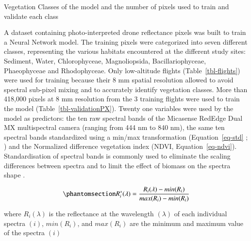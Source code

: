 \documentclass[
  number]{elsarticle}
\begin{document}
\begin{table}

\caption{\label{tbl-validationPX}Vegetation Classes of the model and the
number of pixels used to train and validate each class}


\end{table}%

A dataset containing photo-interpreted drone reflectance pixels was
built to train a Neural Network model. The training pixels were
categorized into seven different classes, representing the various
habitats encountered at the different study sites: Sediment, Water,
Chlorophyceae, Magnoliopsida, Bacillariophyceae, Phaeophyceae and
Rhodophyceae. Only low-altitude flights (Table~\ref{tbl-flights}) were
used for training because their 8 mm spatial resolution allowed to avoid
spectral sub-pixel mixing and to accurately identify vegetation classes.
More than 418,000 pixels at 8 mm resolution from the 3 training flights
were used to train the model (Table~\ref{tbl-validationPX}). Twenty one
variables were used by the model as predictors: the ten raw spectral
bands of the Micasense RedEdge Dual MX multispectral camera (ranging
from 444 nm to 840 nm), the same ten spectral bands standardized using a
min/max transformation (Equation~\ref{eq-std} ; \citep{Cao2017}) and the
Normalized difference vegetation index (NDVI, Equation~\ref{eq-ndvi}).
Standardisation of spectral bands is commonly used to eliminate the
scaling differences between spectra and to limit the effect of biomass
on the spectra shape \citetext{\citealp[
]{Douay2022}; \citealp{Davies2023}}.

\begin{equation}\phantomsection\label{eq-std}{
R_{i}^{*}(\lambda) = \frac{R_{i}(\lambda) - min(R_{i})}{max(R_{i})- min(R_{i})}
}\end{equation}

where \(R_{i}(\lambda)\) is the reflectance at the wavelength
\((\lambda)\) of each individual spectra \((i)\), \(min(R_{i})\), and
\(max(R_{i})\) are the minimum and maximum value of the spectra \((i)\)
\end{document}
